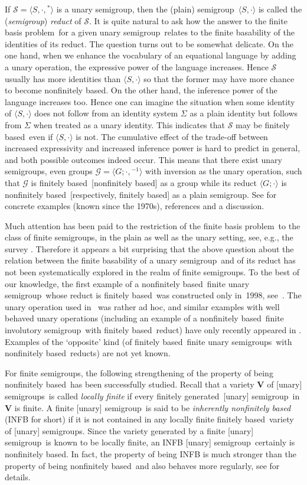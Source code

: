 \documentclass[11pt,reqno]{amsart}
\newcommand{\sgp}{semi\-group}
\newcommand{\sgps}{semi\-groups}
\newcommand{\fis}{finite involutory semi\-group}
\newcommand{\fss}{finite \sgps}
\newcommand{\fus}{finite unary \sgp}
\newcommand{\fuss}{finite unary \sgps}
\newcommand{\fb}{finitely based}
\newcommand{\fbp}{finite basis problem}
\newcommand{\fg}{finitely generated}
\newcommand{\nfb}{non\-finitely based}
\newcommand{\infb}{inherently non\-finitely based}
\begin{document}
If $\mathcal{S}=\langle S,\cdot,{}^*\rangle$ is a unary \sgp, then the (plain) \sgp\ $\langle S,\cdot\rangle$ is called the (\emph{\sgp})
\emph{reduct} of $\mathcal{S}$. It is quite natural to ask how the answer to the \fbp\ for a given unary \sgp\ relates to the finite
basability of the identities of its reduct. The question turns out to be somewhat delicate. On the one hand, when we enhance the vocabulary
of an equational language by adding a unary operation, the expressive power of the language increases. Hence $\mathcal{S}$ usually has more
identities than $\langle S,\cdot\rangle$ so that the former may have more chance to become \nfb. On the other hand, the inference power of
the language increases too. Hence one can imagine the situation when some identity of $\langle S,\cdot\rangle$  does not follow from an
identity system $\Sigma$ as a plain identity but follows from $\Sigma$ when treated as a unary identity. This indicates that $\mathcal{S}$
may be \fb\ even if $\langle S,\cdot\rangle$ is not. The cumulative effect of the trade-off between increased expressivity and increased
inference power is hard to predict in general, and both possible outcomes indeed occur. This means that there exist unary \sgps, even
groups $\mathcal{G}=\langle G;\cdot,{}^{-1}\rangle$ with inversion as the unary operation, such that $\mathcal{G}$ is \fb\ [\nfb] as a
group while its reduct $\langle G;\cdot\rangle$ is \nfb\ [respectively, \fb] as a plain \sgp. See \cite[Section~2]{Volkov:2001} for
concrete examples (known since the 1970s), references and a discussion.

Much attention has been paid to the restriction of the \fbp\ to the class of \fss, in the plain as well as the unary setting, see, e.g.,
the survey \cite{Volkov:2001}. Therefore it appears a bit surprising that the above question about the relation between the finite
basability of a unary \sgp\ and of its reduct has not been systematically explored in the realm of \fss. To the best of our knowledge, the
first example of a \nfb\ \fus\ whose reduct is \fb\ was constructed only in~1998, see~\cite{Lawrence&Willard:1998}. The unary operation
used in~\cite{Lawrence&Willard:1998} was rather ad hoc, and similar examples with well behaved unary operations (including an example of a
\nfb\ \fis\ with \fb\ reduct) have only recently appeared in \cite{Jackson&Volkov:2010}. Examples of the `opposite' kind (of \fb\ \fuss\
with \nfb\ reducts) are not yet known.

For \fss, the following strengthening of the property of being \nfb\ has been successfully studied. Recall that a variety $\mathbf{V}$ of
[unary] \sgps\ is called \emph{locally finite} if every \fg\ [unary] \sgp\ in $\mathbf{V}$ is finite. A finite [unary] \sgp\ is said to be
\emph{\infb} (INFB for short) if it is not contained in any locally finite \fb\ variety of [unary] \sgps. Since the variety generated by a
finite [unary] \sgp\ is known to be locally finite, an INFB [unary] \sgp\ certainly is \nfb. In fact, the property of being INFB is much
stronger than the property of being \nfb\ and also behaves more regularly, see \cite{Volkov:2001} for details.
\end{document}
